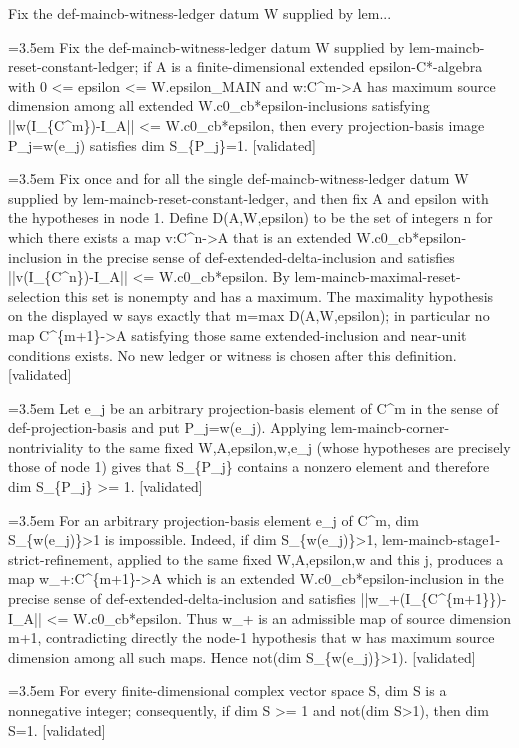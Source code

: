 \documentclass{article}
\newcommand{\step}[1]{\par\noindent\hangindent=3.5em\hangafter=1%
  \makebox[3.5em][l]{\textbf{#1.}}}
\newcommand{\steptag}[1]{\hfill{\small\textsf{[#1]}}}
\begin{document}
\begin{proofbox}{Fix the def-maincb-witness-ledger datum W supplied by lem...}
\step{1} Fix the def-maincb-witness-ledger datum W supplied by lem-maincb-reset-constant-ledger; if A is a finite-dimensional extended epsilon-C*-algebra with 0 <= epsilon <= W.epsilon\_MAIN and w:C\textasciicircum{}m->A has maximum source dimension among all extended W.c0\_cb*epsilon-inclusions satisfying ||w(I\_\{C\textasciicircum{}m\})-I\_A|| <= W.c0\_cb*epsilon, then every projection-basis image P\_j=w(e\_j) satisfies dim S\_\{P\_j\}=1. \steptag{validated} \\[6pt]
\step{1.1} Fix once and for all the single def-maincb-witness-ledger datum W supplied by lem-maincb-reset-constant-ledger, and then fix A and epsilon with the hypotheses in node 1. Define D(A,W,epsilon) to be the set of integers n for which there exists a map v:C\textasciicircum{}n->A that is an extended W.c0\_cb*epsilon-inclusion in the precise sense of def-extended-delta-inclusion and satisfies ||v(I\_\{C\textasciicircum{}n\})-I\_A|| <= W.c0\_cb*epsilon. By lem-maincb-maximal-reset-selection this set is nonempty and has a maximum. The maximality hypothesis on the displayed w says exactly that m=max D(A,W,epsilon); in particular no map C\textasciicircum{}\{m+1\}->A satisfying those same extended-inclusion and near-unit conditions exists. No new ledger or witness is chosen after this definition. \steptag{validated} \\[4pt]
\step{1.2} Let e\_j be an arbitrary projection-basis element of C\textasciicircum{}m in the sense of def-projection-basis and put P\_j=w(e\_j). Applying lem-maincb-corner-nontriviality to the same fixed W,A,epsilon,w,e\_j (whose hypotheses are precisely those of node 1) gives that S\_\{P\_j\} contains a nonzero element and therefore dim S\_\{P\_j\} >= 1. \steptag{validated} \\[4pt]
\step{1.3} For an arbitrary projection-basis element e\_j of C\textasciicircum{}m, dim S\_\{w(e\_j)\}>1 is impossible. Indeed, if dim S\_\{w(e\_j)\}>1, lem-maincb-stage1-strict-refinement, applied to the same fixed W,A,epsilon,w and this j, produces a map w\_+:C\textasciicircum{}\{m+1\}->A which is an extended W.c0\_cb*epsilon-inclusion in the precise sense of def-extended-delta-inclusion and satisfies ||w\_+(I\_\{C\textasciicircum{}\{m+1\}\})-I\_A|| <= W.c0\_cb*epsilon. Thus w\_+ is an admissible map of source dimension m+1, contradicting directly the node-1 hypothesis that w has maximum source dimension among all such maps. Hence not(dim S\_\{w(e\_j)\}>1). \steptag{validated} \\[4pt]
\step{1.4} For every finite-dimensional complex vector space S, dim S is a nonnegative integer; consequently, if dim S >= 1 and not(dim S>1), then dim S=1. \steptag{validated} \\[4pt]
\end{proofbox}
\end{document}
